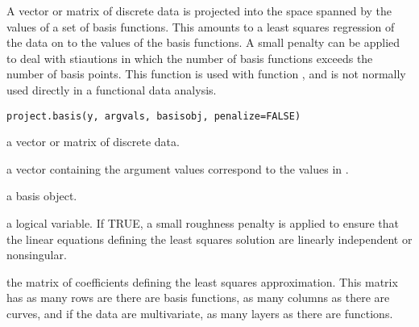 \begin{Description}\relax
A vector or matrix of discrete data is projected into the space
spanned by the values of a set of basis functions.  This amounts to
a least squares regression of the data on to the values of the basis
functions.  A small penalty can be applied to deal with stiautions in
which the number of basis functions exceeds the number of basis points.
This function is used with function , and is not
normally used directly in a functional data analysis.
\end{Description}
\begin{Usage}
\begin{verbatim}
project.basis(y, argvals, basisobj, penalize=FALSE)
\end{verbatim}
\end{Usage}
\begin{Arguments}
\begin{ldescription}
\item[\code{y}] a vector or matrix of discrete data.

\item[\code{argvals}] a vector containing the argument values correspond to the
values in .

\item[\code{basisobj}] a basis object.

\item[\code{penalize}] a logical variable.  If TRUE, a small roughness penalty is applied
to ensure that the linear equations defining the least squares
solution are linearly independent or nonsingular.

\end{ldescription}
\end{Arguments}
\begin{Value}
the matrix of coefficients defining the least squares approximation.
This matrix has as many rows are there are basis functions, as many
columns as there are curves, and if the data are multivariate, as many
layers as there are functions.
\end{Value}
\begin{SeeAlso}\relax
{}
\end{SeeAlso}

